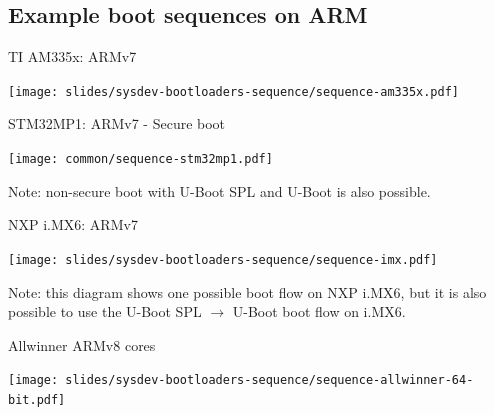 \subsection{Example boot sequences on ARM}

\begin{frame}{TI AM335x: ARMv7}
  \begin{center}
    \texttt{[image: slides/sysdev-bootloaders-sequence/sequence-am335x.pdf]}
  \end{center}
\end{frame}

\begin{frame}{STM32MP1: ARMv7 - Secure boot}
  \begin{center}
    \texttt{[image: common/sequence-stm32mp1.pdf]}
  \end{center}
  \vspace{0.3cm}
  Note: non-secure boot with U-Boot SPL and U-Boot is also possible.
\end{frame}

\begin{frame}{NXP i.MX6: ARMv7}
  \begin{center}
    \texttt{[image: slides/sysdev-bootloaders-sequence/sequence-imx.pdf]}
  \end{center}
  \vspace{0.1cm}
  Note: this diagram shows one possible boot flow on NXP i.MX6, but it
  is also possible to use the U-Boot SPL $\rightarrow$ U-Boot boot
  flow on i.MX6.
\end{frame}

\begin{frame}{Allwinner ARMv8 cores}
  \begin{center}
    \texttt{[image: slides/sysdev-bootloaders-sequence/sequence-allwinner-64-bit.pdf]}
  \end{center}
\end{frame}
